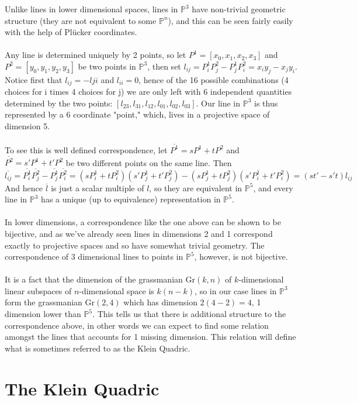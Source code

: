 \documentclass{article}
\begin{document}
Unlike lines in lower dimensional spaces, lines in $\mathbb{P}^3$ have non-trivial geometric structure (they are not equivalent to some $\mathbb{P}^n$), and this can be seen fairly easily with the help of Pl\"ucker coordinates. \\
\\
Any line is determined uniquely by 2 points, so let $P^1=[x_0,x_1,x_2,x_3]$ and $P^2=[y_0,y_1,y_2,y_3]$ be two points in $\mathbb{P}^3$, then set $l_{ij}=P^1_iP^2_j-P^1_jP^2_i=x_iy_j-x_jy_i$. Notice first that $l_{ij}=-l{ji}$ and $l_{ii}=0$, hence of the 16 possible combinations (4 choices for i times 4 choices for j) we are only left with 6 independent quantities determined by the two points: $[l_{23},l_{31},l_{12},l_{01},l_{02},l_{03}]$. Our line in $\mathbb{P}^3$ is thus represented by a 6 coordinate "point," which, lives in a projective space of dimension 5.\\
\\
To see this is well defined correspondence, let $\overline{P^1} = sP^1 + tP^2$ and $\overline{P^2}=s'P^1+t'P^2$ be two different points on the same line. Then 
$$
\overline{l_{ij}}=\overline{P^1_i}\overline{P^2_j}-\overline{P^1_j}\overline{P^2_i}=(sP^1_i+tP^2_i)(s'P^1_j+t'P^2_j)-(sP^1_j+tP^2_j)(s'P^1_i+t'P^2_i)=(st'-s't)l_{ij}
$$
And hence $\overline{l}$ is just a scalar multiple of $l$, so they are equivalent in $\mathbb{P}^5$, and every line in $\mathbb{P}^3$ has a unique (up to equivalence) representation in $\mathbb{P}^5$.\\
\\
In lower dimensions, a correspondence like the one above can be shown to be bijective, and as we've already seen lines in dimensions 2 and 1 correspond exactly to projective spaces and so have somewhat trivial geometry. The correspondence of 3 dimensional lines to points in $\mathbb{P}^5$, however, is not bijective. \\
\\
It is a fact that the dimension of the grassmanian $\text{Gr}(k,n)$ of $k$-dimensional linear subspaces of $n$-dimensional space is $k(n-k)$, so in our case lines in $\mathbb{P}^3$ form the grassmanian $\text{Gr}(2,4)$ which has dimension $2(4-2)=4$, 1 dimension lower than $\mathbb{P}^5$. This tells us that there is additional structure to the correspondence above, in other words we can expect to find some relation amongst the lines that accounts for 1 missing dimension. This relation will define what is sometimes referred to as the Klein Quadric.

\section{The Klein Quadric}
\end{document}
